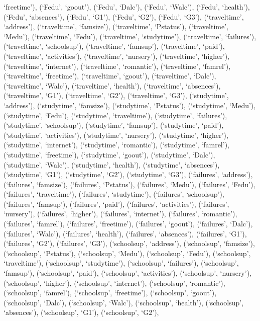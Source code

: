 \documentclass[
]{article}
\begin{document}
`freetime'), (`Fedu', `goout'), (`Fedu', `Dalc'), (`Fedu', `Walc'),
(`Fedu', `health'), (`Fedu', `absences'), (`Fedu', `G1'), (`Fedu',
`G2'), (`Fedu', `G3'), (`traveltime', `address'), (`traveltime',
`famsize'), (`traveltime', `Pstatus'), (`traveltime', `Medu'),
(`traveltime', `Fedu'), (`traveltime', `studytime'), (`traveltime',
`failures'), (`traveltime', `schoolsup'), (`traveltime', `famsup'),
(`traveltime', `paid'), (`traveltime', `activities'), (`traveltime',
`nursery'), (`traveltime', `higher'), (`traveltime', `internet'),
(`traveltime', `romantic'), (`traveltime', `famrel'), (`traveltime',
`freetime'), (`traveltime', `goout'), (`traveltime', `Dalc'),
(`traveltime', `Walc'), (`traveltime', `health'), (`traveltime',
`absences'), (`traveltime', `G1'), (`traveltime', `G2'), (`traveltime',
`G3'), (`studytime', `address'), (`studytime', `famsize'), (`studytime',
`Pstatus'), (`studytime', `Medu'), (`studytime', `Fedu'), (`studytime',
`traveltime'), (`studytime', `failures'), (`studytime', `schoolsup'),
(`studytime', `famsup'), (`studytime', `paid'), (`studytime',
`activities'), (`studytime', `nursery'), (`studytime', `higher'),
(`studytime', `internet'), (`studytime', `romantic'), (`studytime',
`famrel'), (`studytime', `freetime'), (`studytime', `goout'),
(`studytime', `Dalc'), (`studytime', `Walc'), (`studytime', `health'),
(`studytime', `absences'), (`studytime', `G1'), (`studytime', `G2'),
(`studytime', `G3'), (`failures', `address'), (`failures', `famsize'),
(`failures', `Pstatus'), (`failures', `Medu'), (`failures', `Fedu'),
(`failures', `traveltime'), (`failures', `studytime'), (`failures',
`schoolsup'), (`failures', `famsup'), (`failures', `paid'), (`failures',
`activities'), (`failures', `nursery'), (`failures', `higher'),
(`failures', `internet'), (`failures', `romantic'), (`failures',
`famrel'), (`failures', `freetime'), (`failures', `goout'), (`failures',
`Dalc'), (`failures', `Walc'), (`failures', `health'), (`failures',
`absences'), (`failures', `G1'), (`failures', `G2'), (`failures', `G3'),
(`schoolsup', `address'), (`schoolsup', `famsize'), (`schoolsup',
`Pstatus'), (`schoolsup', `Medu'), (`schoolsup', `Fedu'), (`schoolsup',
`traveltime'), (`schoolsup', `studytime'), (`schoolsup', `failures'),
(`schoolsup', `famsup'), (`schoolsup', `paid'), (`schoolsup',
`activities'), (`schoolsup', `nursery'), (`schoolsup', `higher'),
(`schoolsup', `internet'), (`schoolsup', `romantic'), (`schoolsup',
`famrel'), (`schoolsup', `freetime'), (`schoolsup', `goout'),
(`schoolsup', `Dalc'), (`schoolsup', `Walc'), (`schoolsup', `health'),
(`schoolsup', `absences'), (`schoolsup', `G1'), (`schoolsup', `G2'),
\end{document}

